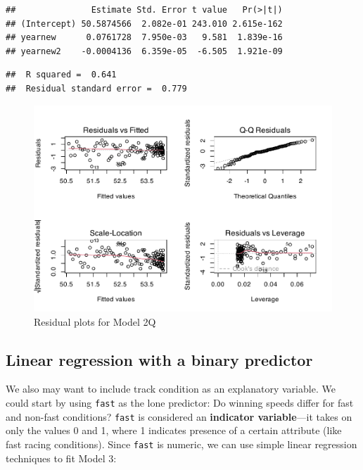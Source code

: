 \documentclass[
]{krantz}
\begin{document}
\begin{verbatim}
##               Estimate Std. Error t value   Pr(>|t|)
## (Intercept) 50.5874566  2.082e-01 243.010 2.615e-162
## yearnew      0.0761728  7.950e-03   9.581  1.839e-16
## yearnew2    -0.0004136  6.359e-05  -6.505  1.921e-09
\end{verbatim}

\begin{verbatim}
##  R squared =  0.641 
##  Residual standard error =  0.779
\end{verbatim}

\begin{figure}

{\centering \includegraphics[width=0.9\linewidth]{bookdown-BeyondMLR_files/figure-latex/resid2q-1} 

}

\caption{Residual plots for Model 2Q}\label{fig:resid2q}
\end{figure}

\hypertarget{linear-regression-with-a-binary-predictor}{%
\subsection{Linear regression with a binary predictor}\label{linear-regression-with-a-binary-predictor}}

We also may want to include track condition as an explanatory variable. We could start by using \texttt{fast} as the lone predictor: Do winning speeds differ for fast and non-fast conditions? \texttt{fast} is considered an \textbf{indicator variable}---it takes on only the values 0 and 1,  where 1 indicates presence of a certain attribute (like fast racing conditions). Since \texttt{fast} is numeric, we can use simple linear regression techniques to fit Model 3:
\end{document}
